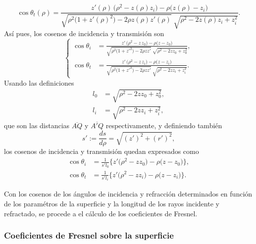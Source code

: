 \begin{equation}
\cos\theta_t(\rho)
=
\frac{
z'(\rho)\,\big(\rho^2-z(\rho)z_i\big)
-
\rho\big(z(\rho)-z_i\big)
}
{
\sqrt{\rho^2\big(1+z'(\rho)^2\big)-2\rho z(\rho)z'(\rho)}
\;
\sqrt{\rho^2-2z(\rho)z_i+z_i^2}
}.
\label{eq:cos_theta_t_ovoid}
\end{equation}
Así pues, los cosenos de incidencia y transmisión son
\begin{equation}
\left\{
\begin{aligned}
\cos\theta_i
&=
\frac{
z'\,\big(\rho^2 - z\,z_0\big) - \rho\big(z - z_0\big)
}
{
\sqrt{\rho^2\big(1+z'^2\big) - 2\rho z z'}\;
\sqrt{\rho^2 - 2 z z_0 + z_0^2}
},
\\
\cos\theta_t
&=
\frac{
z'\,\big(\rho^2 - z\,z_i\big) - \rho\big(z - z_i\big)
}
{
\sqrt{\rho^2\big(1+z'^2\big) - 2\rho z z'}\;
\sqrt{\rho^2 - 2 z z_i + z_i^2}
}.
\end{aligned}
\right.
\label{cosines_ovoid_compact}
\end{equation}
Usando las definiciones
\begin{align}
l_0
&=
\sqrt{\rho^2 - 2zz_0 + z_0^2},
\\
l_i
&=
\sqrt{\rho^2 - 2zz_i + z_i^2},
\label{eq:l0_li_definitions}
\end{align}
que son las distancias $\overline{AQ}$ y $\overline{A'Q}$ respectivamente, y definiendo también
\begin{equation}
  s'
  :=
  \frac{ds}{d\rho}
  =
  \sqrt{(z')^2 + (r')^2},
  \label{eq:ds_drho}
\end{equation}
los cosenos de incidencia y transmisión quedan expresados como
\begin{equation}
\begin{aligned}
  \cos\theta_i
  &=
  \frac{1}{s'l_0}
  \big\{
  z'\big(\rho^2 - z z_0\big)
  -
  \rho\big(z - z_0\big)
  \big\},
\\
  \cos\theta_t
  &=
  \frac{1}{s'l_i}
  \big\{
  z'\big(\rho^2 - z z_i\big)
  -
  \rho\big(z - z_i\big)
  \big\}.
\end{aligned}
\label{cosines_ovoid}
\end{equation}


Con los cosenos de los ángulos de incidencia y refracción determinados en función de los paramétros de la superficie y la longitud de los rayos incidente y refractado, se procede a el cálculo de los coeficientes de Fresnel.


\subsubsection{Coeficientes de Fresnel sobre la superficie}

